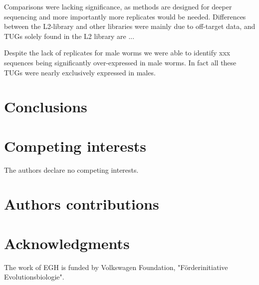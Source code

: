 \documentclass[10pt]{bmc_article}
\newenvironment{bmcformat}{\begin{raggedright}\baselineskip20pt\sloppy\setboolean{publ}{false}}{\end{raggedright}\baselineskip20pt\sloppy}
\begin{document}
\begin{bmcformat}
Comparisons were lacking significance, as methods are designed for
deeper sequencing and more importantly more replicates would be
needed. Differences between the L2-library and other libraries were
mainly due to off-target data, and TUGs solely found in the L2 library
are ... 


Despite the lack of replicates for male worms we were able to identify
xxx sequences being significantly over-expressed in male worms. In
fact all these TUGs were nearly exclusively expressed in males.



\section*{Conclusions}

  
\section*{Competing interests}
The authors declare no competing interests.

\section*{Authors contributions}

\section*{Acknowledgments}

The work of EGH is funded by
Volkswagen Foundation, "F\"{o}rderinitiative Evolutionsbiologie".
 


\end{bmcformat}
\end{document}
